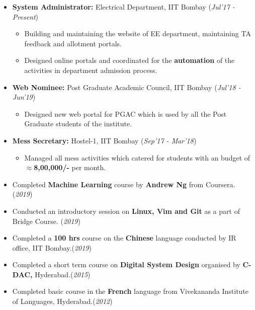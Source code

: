 \documentclass[10pt]{article}
\begin{document}
\begin{itemize}[leftmargin=0.4cm]


\item \textbf {System Administrator:}  Electrical Department, IIT Bombay \hfill{(\textit{Jul'17 - Present})}
\begin{itemize}
    \item Building and maintaining the website of EE department, maintaining TA feedback and allotment portals.
    \item Designed online portals and coordinated for the \textbf{automation} of the activities in department admission process.
\end{itemize}
    


\item \textbf{Web Nominee:} Post Graduate Academic Council, IIT Bombay \hfill{(\textit{Jul'18 - Jun'19})}
\begin{itemize}
	\item Designed new web portal for PGAC which is used by all the Post Graduate students of the institute. 
\end{itemize}

\item \textbf{Mess Secretary:}  Hostel-1, IIT Bombay   \hfill{(\textit{Sep'17 - Mar'18})}
\begin{itemize}
	\item Managed all mess activities which catered for  students with an budget of \textbf{$\approx$8,00,000/-} per month.
\end{itemize}


\end{itemize}
%

\colorbox{bl}{} 

\begin{itemize}[leftmargin=0.4cm]
    \item {Completed \textbf{Machine Learning} course by \textbf{Andrew Ng} from Coursera. }\hfill{(\textit{2019})}
    \item {Conducted an introductory session on \textbf{Linux, Vim and Git} as a part of Bridge Course. }\hfill{(\textit{2019})}
    \item {Completed a \textbf{100 hrs} course on the \textbf{Chinese} language conducted by IR office, IIT Bombay.}\hfill{(\textit{2019})}
    \item {Completed a short term course on \textbf{Digital System Design} organised by \textbf{C-DAC,} Hyderabad.}\hfill{(\textit{2015})}
    \item {Completed basic course in the \textbf{French} language from Vivekananda Institute of Languages, Hyderabad.}\hfill{(\textit{2012})}
\end{itemize}

\end{document}
